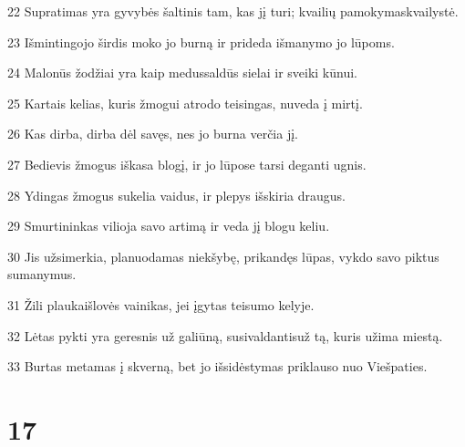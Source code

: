 \par 22 Supratimas yra gyvybės šaltinis tam, kas jį turi; kvailių pamokymas­kvailystė. 
\par 23 Išmintingojo širdis moko jo burną ir prideda išmanymo jo lūpoms. 
\par 24 Malonūs žodžiai yra kaip medus­saldūs sielai ir sveiki kūnui. 
\par 25 Kartais kelias, kuris žmogui atrodo teisingas, nuveda į mirtį. 
\par 26 Kas dirba, dirba dėl savęs, nes jo burna verčia jį. 
\par 27 Bedievis žmogus iškasa blogį, ir jo lūpose tarsi deganti ugnis. 
\par 28 Ydingas žmogus sukelia vaidus, ir plepys išskiria draugus. 
\par 29 Smurtininkas vilioja savo artimą ir veda jį blogu keliu. 
\par 30 Jis užsimerkia, planuodamas niekšybę, prikandęs lūpas, vykdo savo piktus sumanymus. 
\par 31 Žili plaukai­šlovės vainikas, jei įgytas teisumo kelyje. 
\par 32 Lėtas pykti yra geresnis už galiūną, susivaldantis­už tą, kuris užima miestą. 
\par 33 Burtas metamas į skverną, bet jo išsidėstymas priklauso nuo Viešpaties.



\chapter{17}


